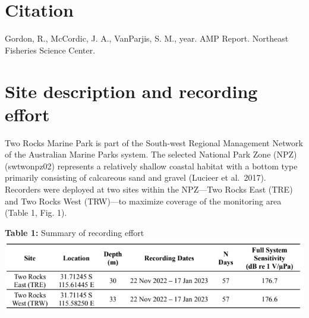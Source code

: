 \documentclass[
  letterpaper,
  oneside,
  open=any]{scrbook}
\renewcommand*\contentsname{Table of contents}
\newcommand\contentsname{Table of contents}
\begin{document}
\begin{frontmatter}
\begin{titlepage}
\begin{minipage}[b][\textheight][s]{\minipagewidth}
\titleblock

\authorblock

\affiliationblock

\vfill

\logoblock

\footerblock
\par

\end{minipage}
\clearpage
\restoregeometry
\end{titlepage}
\setcounter{page}{1}
\end{frontmatter}


\renewcommand*\contentsname{Table of contents}
{
\setcounter{tocdepth}{1}
\tableofcontents
}
\listoffigures
\listoftables
\mainmatter
{}

\chapter*{Citation}\label{citation}


Gordon, R., McCordic, J. A., VanParjis, S. M., year. AMP Report.
Northeast Fisheries Science Center.


\chapter{Site description and recording
effort}\label{site-description-and-recording-effort}

Two Rocks Marine Park is part of the South-west Regional Management
Network of the Australian Marine Parks system. The selected National
Park Zone (NPZ) (swtwonpz02) represents a relatively shallow coastal
habitat with a bottom type primarily consisting of calcareous sand and
gravel (Lucieer et al.~2017). Recorders were deployed at two sites
within the NPZ---Two Rocks East (TRE) and Two Rocks West (TRW)---to
maximize coverage of the monitoring area (Table 1, Fig. 1).

\textbf{Table 1:} Summary of recording effort
\includegraphics{images/Table.1.PNG}
\end{document}
